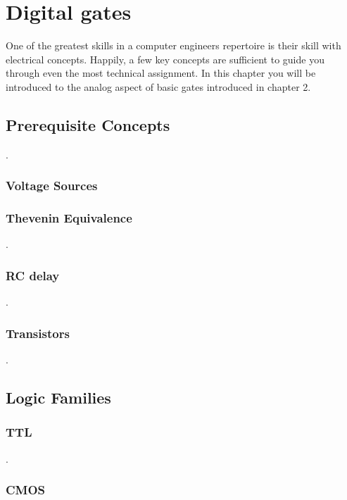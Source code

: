 \chapter{Digital gates}

One of the greatest skills in a computer engineers repertoire 
is their skill with electrical concepts.  Happily, a few 
key concepts are sufficient to guide you
through even the most technical assignment.  In this chapter 
you will be introduced to the analog aspect of basic gates
introduced in chapter 2.  

\section{Prerequisite Concepts}
\pagebreak
.

\subsection{Voltage Sources}

\subsection{Thevenin Equivalence}
\pagebreak
.

\subsection{RC delay}
\pagebreak
.

\subsection{Transistors}
\pagebreak
.

\section{Logic Families}

\subsection{TTL}
\pagebreak
.


\subsection{CMOS}


